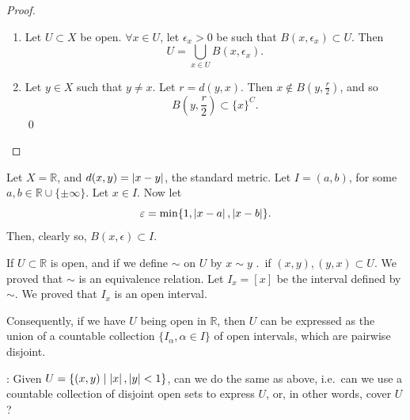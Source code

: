\documentclass[notoc,notitlepage]{tufte-book}
\begin{document}
\begin{proof}
\begin{enumerate}
    \item Let $U \subset X$ be open. $\forall x \in U$, let $\epsilon_x > 0$ be such that $B(x, \epsilon_x) \subset U$. Then
      \begin{equation*}
        U = \bigcup_{x \in U} B(x, \epsilon_x).
      \end{equation*}

    \item Let $y \in X$ such that $y \neq x$. Let $r = d(y, x)$. Then $x \notin B\left(y, \frac{r}{2}\right)$, and so
      \begin{equation*}
        B\left(y, \frac{r}{2}\right) \subset \{ x \}^C.
      \end{equation*}\qed
  \end{enumerate}
\end{proof}

\begin{eg}
  Let $X = \mathbb{R}$, and $d(x, y) = \left|x - y\right|$, the standard metric. Let $I = (a, b)$, for some $a, b \in \mathbb{R} \cup \{ \pm \infty \}$. Let $x \in I$. Now let
  \begin{equation*}
    \varepsilon = \min \{ 1, \left|x - a\right|, \left|x - b\right| \}.
  \end{equation*}
  Then, clearly so, $B(x, \epsilon) \subset I$.
\end{eg}

If $U \subset \mathbb{R}$ is open, and if we define $\sim$ on $U$ by $x \sim y$ .\ if $(x, y) , (y, x) \subset U$. We proved that $\sim$ is an equivalence relation. Let $I_x = [x]$ be the interval defined by $\sim$. We proved that $I_x$ is an open interval.

Consequently, if we have $U$ being open in $\mathbb{R}$, then $U$ can be expressed as the union of a countable collection $\{ I_\alpha, \alpha \in I \}$ of open intervals, which are pairwise disjoint.

: Given $U = \{ (x, y) \mid \left|x\right|, \left|y\right| < 1 \}$, can we do the same as above, i.e.\ can we use a countable collection of disjoint open sets to express $U$, or, in other words, cover $U$?
\end{document}
